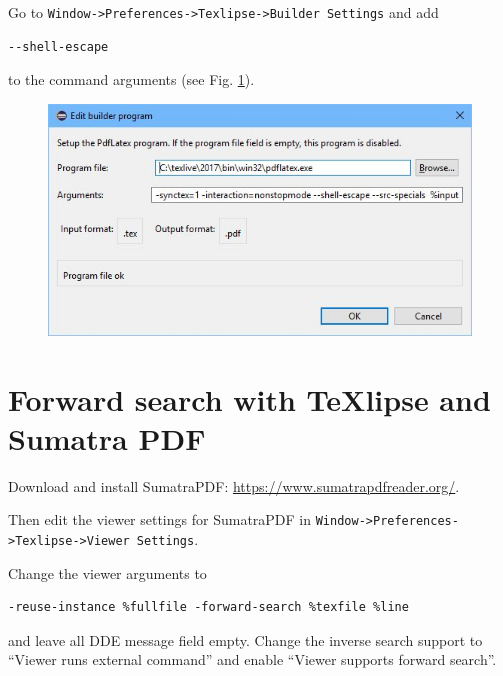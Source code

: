 \begin{otherlanguage}{english}
Go to \texttt{Window->Preferences->Texlipse->Builder Settings} and add 
%
\begin{verbatim}
--shell-escape
\end{verbatim}
%
to the command arguments (see Fig. \ref{fig:builder_settings}).
%
\begin{figure}[htb]
	\centering
	\includegraphics[scale=0.40]{images/PdfLatex_settings.jpg}
	\label{fig:builder_settings}
\end{figure}

\section{Forward search with TeXlipse and Sumatra PDF}

Download and install SumatraPDF: \url{https://www.sumatrapdfreader.org/}.

Then edit the viewer settings for SumatraPDF in \texttt{Window->Preferences->Texlipse->Viewer Settings}.

Change the viewer arguments to
%
\begin{verbatim}
-reuse-instance %fullfile -forward-search %texfile %line
\end{verbatim}
%
and leave all DDE message field empty.
Change the inverse search support to "`Viewer runs external command"' and enable "`Viewer supports forward search"'.


\end{otherlanguage}
